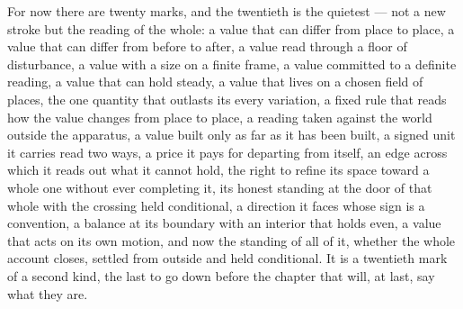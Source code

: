For now there are twenty marks, and the twentieth is the quietest --- not a new stroke but the reading of the whole: a value that can differ from place to place, a value that can differ from before to after, a value read through a floor of disturbance, a value with a size on a finite frame, a value committed to a definite reading, a value that can hold steady, a value that lives on a chosen field of places, the one quantity that outlasts its every variation, a fixed rule that reads how the value changes from place to place, a reading taken against the world outside the apparatus, a value built only as far as it has been built, a signed unit it carries read two ways, a price it pays for departing from itself, an edge across which it reads out what it cannot hold, the right to refine its space toward a whole one without ever completing it, its honest standing at the door of that whole with the crossing held conditional, a direction it faces whose sign is a convention, a balance at its boundary with an interior that holds even, a value that acts on its own motion, and now the standing of all of it, whether the whole account closes, settled from outside and held conditional. It is a twentieth mark of a second kind, the last to go down before the chapter that will, at last, say what they are.
